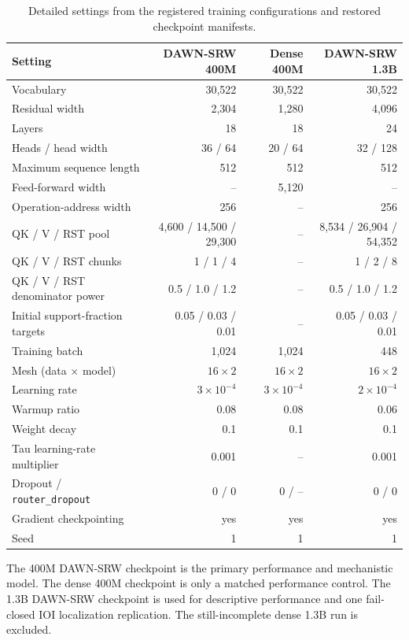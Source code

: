 \documentclass{article}
\newcommand{\DAWN}{DAWN-SRW}
\begin{document}
\begin{table}[!t]
\centering
\caption{Detailed settings from the registered training configurations and
restored checkpoint manifests.}
\scriptsize
\renewcommand{\arraystretch}{0.94}
\begin{tabular}{lrrr}
\toprule
Setting & \DAWN{} 400M & Dense 400M & \DAWN{} 1.3B\\
\midrule
Vocabulary & 30,522 & 30,522 & 30,522\\
Residual width & 2,304 & 1,280 & 4,096\\
Layers & 18 & 18 & 24\\
Heads / head width & 36 / 64 & 20 / 64 & 32 / 128\\
Maximum sequence length & 512 & 512 & 512\\
Feed-forward width & -- & 5,120 & --\\
Operation-address width & 256 & -- & 256\\
QK / V / RST pool & 4,600 / 14,500 / 29,300 & -- &
8,534 / 26,904 / 54,352\\
QK / V / RST chunks & 1 / 1 / 4 & -- & 1 / 2 / 8\\
QK / V / RST denominator power & 0.5 / 1.0 / 1.2 & -- &
0.5 / 1.0 / 1.2\\
Initial support-fraction targets & 0.05 / 0.03 / 0.01 & -- &
0.05 / 0.03 / 0.01\\
Training batch & 1,024 & 1,024 & 448\\
Mesh (data \(\times\) model) & \(16\times2\) & \(16\times2\) & \(16\times2\)\\
Learning rate & \(3\times10^{-4}\) & \(3\times10^{-4}\) & \(2\times10^{-4}\)\\
Warmup ratio & 0.08 & 0.08 & 0.06\\
Weight decay & 0.1 & 0.1 & 0.1\\
Tau learning-rate multiplier & 0.001 & -- & 0.001\\
Dropout / \texttt{router\_dropout} & 0 / 0 & 0 / -- & 0 / 0\\
Gradient checkpointing & yes & yes & yes\\
Seed & 1 & 1 & 1\\
\bottomrule
\end{tabular}
\end{table}

The 400M \DAWN{} checkpoint is the primary performance and mechanistic model.
The dense 400M checkpoint is only a matched performance control. The 1.3B
\DAWN{} checkpoint is used for descriptive performance and one fail-closed IOI
localization replication. The still-incomplete dense 1.3B run is excluded.
\end{document}
